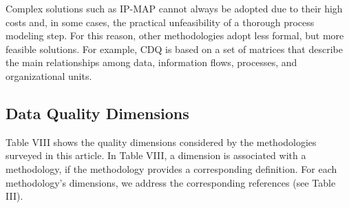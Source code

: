 \documentclass[pdftex,english,oribibl]{llncs}
\begin{document}
Complex solutions such as IP-MAP cannot always be adopted due to their high costs and, in some cases, the practical unfeasibility of a thorough process modeling step.
For this reason, other methodologies adopt less formal, but more feasible solutions.
For example, CDQ is based on a set of matrices that describe the main relationships among data, information flows, processes, and organizational units.
\begin{comment}
The relationship between organizational units and processes has also been modeled in extensions of IP-MAP proposed in the literature [Scannapieco et al. 2002].
\end{comment}

\subsection{Data Quality Dimensions}
Table VIII shows the quality dimensions considered by the methodologies surveyed in this article.
In Table VIII, a dimension is associated with a methodology, if the methodology provides a corresponding definition.
For each methodology’s dimensions, we address the corresponding references (see Table III).
\end{document}
